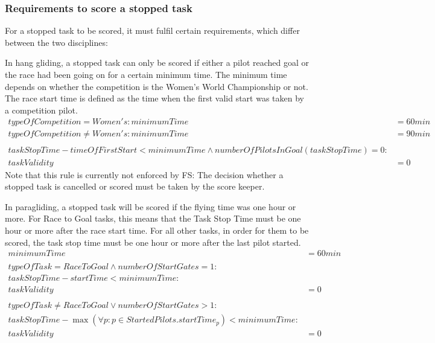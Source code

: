 \documentclass{article}
\begin{document}
\subsubsection{Requirements to score a stopped task}
For a stopped task to be scored, it must fulfil certain requirements, which differ between the two
disciplines:

In hang gliding, a stopped task can only be scored if either a pilot reached goal or the race had been
going on for a certain minimum time. The minimum time depends on whether the competition is the
Women’s World Championship or not. The race start time is defined as the time when the first valid
start was taken by a competition pilot.
\begin{align*}
    typeOfCompetition = Women's : minimumTime &= 60min \\
    typeOfCompetition \neq Women's : minimumTime &= 90min \\
    \\
    taskStopTime - timeOfFirstStart < minimumTime \land numberOfPilotsInGoal(taskStopTime) = 0 : \\
    taskValidity &= 0
\end{align*}
Note that this rule is currently not enforced by FS: The decision whether a stopped task is cancelled or
scored must be taken by the score keeper.

In paragliding, a stopped task will be scored if the flying time was one hour or more. For Race to Goal
tasks, this means that the Task Stop Time must be one hour or more after the race start time. For all
other tasks, in order for them to be scored, the task stop time must be one hour or more after the last
pilot started.
\begin{align*}
    minimumTime &= 60min \\
    \\
    typeOfTask = RaceToGoal \land numberOfStartGates = 1 : \\
    taskStopTime - startTime < minimumTime : \\
    taskValidity &= 0 \\
    \\
    typeOfTask \neq RaceToGoal \lor numberOfStartGates > 1 : \\
    taskStopTime - \max(\forall p : p \in StartedPilots . startTime_p) < minimumTime : \\
    taskValidity &= 0
\end{align*}
\end{document}
